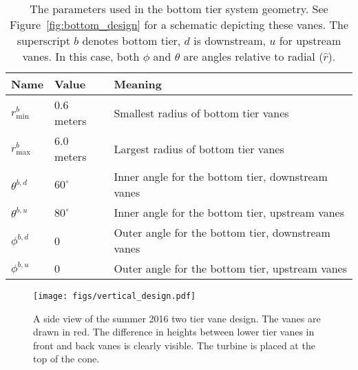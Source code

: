 \begin{table}[]
\centering
 \caption{The parameters used in the bottom tier system geometry. See 
 Figure~\ref{fig:bottom_design} for a schematic depicting these
 vanes. The superscript $b$ denotes bottom tier, $d$ is downstream, $u$
 for upstream vanes. In this case, both $\phi$ and $\theta$ are angles
 relative to radial ($\hat r$). }
\begin{tabular}{l|l|l}
Name                        & Value & Meaning                    \\
 \hline
$r^b_{\text{min}}$          &  0.6 meters & Smallest radius of bottom tier vanes \\
$r^b_{\text{max}}$          &  6.0 meters & Largest radius of bottom tier vanes \\
$\theta^{b,d}$ &  $60^{\circ}$   & Inner angle for the bottom tier, downstream vanes \\
$\theta^{b,u}$ &  $80^{\circ}$   & Inner angle for the bottom tier, upstream vanes \\
$\phi^{b,d}$ &   0   & Outer angle for the bottom  tier, downstream vanes \\
$\phi^{b,u}$ &   0   & Outer angle for the bottom tier, upstream vanes \\
\end{tabular}
 \label{tab:bottom}
\end{table}


\begin{figure}[!htb]
  \begin{center}
   \texttt{[image: figs/vertical\_design.pdf]}
   \caption{A side view of the summer 2016 two tier vane design. The
     vanes are drawn in red. The difference in heights between lower
     tier vanes in front and back vanes is clearly visible. The turbine
     is placed at the top of the cone.}
   \label{fig:vertical_design}
  \end{center}
 \end{figure}

